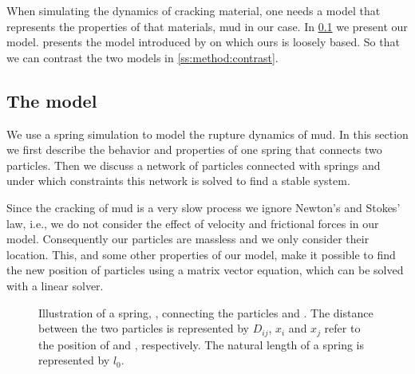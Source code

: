 
When simulating the dynamics of cracking material, one needs a model that represents the properties of that materials, mud in our case. In \cref{ss:method:model} we present our model.  presents the model introduced by \citeauthor{vogel2005studies2} on which ours is loosely based. So that we can contrast the two models in \cref{ss:method:contrast}.

\subsection{The model}\label{ss:method:model} 

We use a spring simulation to model the rupture dynamics of mud. In this section we first describe the behavior and properties of one spring that connects two particles. Then we discuss a network of particles connected with springs and under which constraints this network is solved to find a stable system.

Since the cracking of mud is a very slow process we ignore Newton's and Stokes' law, i.e., we do not consider the effect of velocity and frictional forces in our model. Consequently our particles are massless and we only consider their location. This, and some other properties of our model, make it possible to find the new position of particles using a matrix vector equation, which can be solved with a linear solver.

\begin{figure}
	\centering
	\caption{Illustration of a spring, , connecting the particles  and . The distance between the two particles is represented by $D_{ij}$, $x_i$ and $x_j$ refer to the position of  and , respectively. The natural length of a spring is represented by $l_0$.}
	\label{fig:method:spring}
\end{figure}

